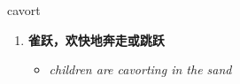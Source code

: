 
\begin{frame}
{\huge cavort}
\begin{center}
\begin{enumerate}\Large
  \item \textbf{雀跃，欢快地奔走或跳跃}
  \begin{itemize}
    \item \em{\Large{children are cavorting in the sand}}
  \end{itemize}
\end{enumerate}
\end{center}
\end{frame}
